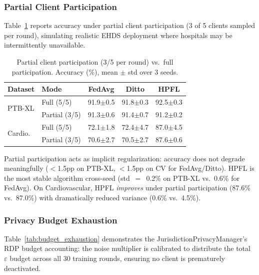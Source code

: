 \documentclass[conference]{IEEEtran}
\begin{document}
\subsubsection{Partial Client Participation}
\label{sec:partial_participation}

Table~\ref{tab:partial_participation} reports accuracy under partial client participation (3 of 5 clients sampled per round), simulating realistic EHDS deployment where hospitals may be intermittently unavailable.

\begin{table}[htbp]
\centering
\caption{Partial client participation (3/5 per round) vs.\ full participation. Accuracy (\%), mean $\pm$ std over 3 seeds.}
\label{tab:partial_participation}
\small
\begin{tabular}{llccc}
\toprule
\textbf{Dataset} & \textbf{Mode} & \textbf{FedAvg} & \textbf{Ditto} & \textbf{HPFL} \\
\midrule
\multirow{2}{*}{PTB-XL} & Full (5/5) & 91.9$\pm$0.5 & 91.8$\pm$0.3 & 92.5$\pm$0.3 \\
 & Partial (3/5) & 91.3$\pm$0.6 & 91.4$\pm$0.7 & 91.2$\pm$0.2 \\
\midrule
\multirow{2}{*}{Cardio.} & Full (5/5) & 72.1$\pm$1.8 & 72.4$\pm$4.7 & 87.0$\pm$4.5 \\
 & Partial (3/5) & 70.6$\pm$2.7 & 70.5$\pm$2.7 & 87.6$\pm$0.6 \\
\bottomrule
\end{tabular}

\vspace{1mm}
\footnotesize{Partial participation acts as implicit regularization: accuracy does not degrade meaningfully ($<$1.5pp on PTB-XL, $<$1.5pp on CV for FedAvg/Ditto). HPFL is the most stable algorithm cross-seed (std~$=$~0.2\% on PTB-XL vs.\ 0.6\% for FedAvg). On Cardiovascular, HPFL \textit{improves} under partial participation (87.6\% vs.\ 87.0\%) with dramatically reduced variance (0.6\% vs.\ 4.5\%).}
\end{table}

\subsubsection{Privacy Budget Exhaustion}
\label{sec:budget_exhaustion}

Table~\ref{tab:budget_exhaustion} demonstrates the JurisdictionPrivacyManager's RDP budget accounting: the noise multiplier is calibrated to distribute the total $\varepsilon$ budget across all 30 training rounds, ensuring no client is prematurely deactivated.
\end{document}
